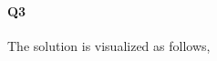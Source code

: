 \documentclass[11pt]{article}
\begin{document}
\paragraph{Q3}
The solution is visualized as follows,
\begin{figure}[H]
	\centering
\end{figure}
\end{document}
